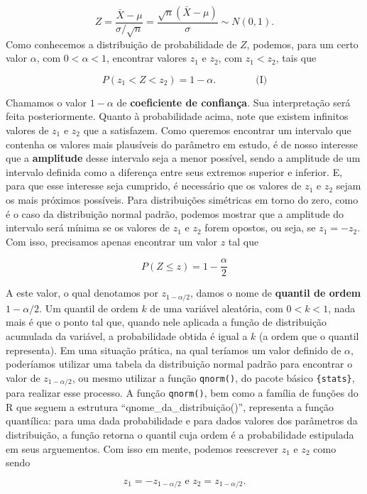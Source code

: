 \documentclass[
  letterpaper,
  DIV=11,
  numbers=noendperiod]{scrreprt}
\begin{document}
\[
Z = \frac{\bar{X} - \mu}{\sigma/\sqrt{n}} = \frac{\sqrt{n}\left(\bar{X} - \mu\right)}{\sigma} \sim N(0, 1).
\] Como conhecemos a distribuição de probabilidade de \(Z\), podemos,
para um certo valor \(\alpha\), com \(0 < \alpha < 1\), encontrar
valores \(z_1\) e \(z_2\), com \(z_1 < z_2\), tais que

\[
P(z_1 < Z < z_2) = 1 - \alpha.  \qquad \qquad \text{(I)}
\]

Chamamos o valor \(1 - \alpha\) de \textbf{coeficiente de confiança}.
Sua interpretação será feita posteriormente. Quanto à probabilidade
acima, note que existem infinitos valores de \(z_1\) e \(z_2\) que a
satisfazem. Como queremos encontrar um intervalo que contenha os valores
mais plausíveis do parâmetro em estudo, é de nosso interesse que a
\textbf{amplitude} desse intervalo seja a menor possível, sendo a
amplitude de um intervalo definida como a diferença entre seus extremos
superior e inferior. E, para que esse interesse seja cumprido, é
necessário que os valores de \(z_1\) e \(z_2\) sejam os mais próximos
possíveis. Para distribuições simétricas em torno do zero, como é o caso
da distribuição normal padrão, podemos mostrar que a amplitude do
intervalo será mínima se os valores de \(z_1\) e \(z_2\) forem opostos,
ou seja, se \(z_1 = -z_2\). Com isso, precisamos apenas encontrar um
valor \(z\) tal que

\[
P(Z \leqslant z) = 1 - \frac{\alpha}{2}
\]

A este valor, o qual denotamos por \(z_{1 - \alpha/2}\), damos o nome de
\textbf{quantil de ordem} \(1 - \alpha/2\). Um quantil de ordem \(k\) de
uma variável aleatória, com \(0 < k < 1\), nada mais é que o ponto tal
que, quando nele aplicada a função de distribuição acumulada da
variável, a probabilidade obtida é igual a \(k\) (a ordem que o quantil
representa). Em uma situação prática, na qual teríamos um valor definido
de \(\alpha\), poderíamos utilizar uma tabela da distribuição normal
padrão para encontrar o valor de \(z_{1 - \alpha/2}\), ou mesmo utilizar
a função \texttt{qnorm()}, do pacote básico \texttt{\{stats\}}, para
realizar esse processo. A função \texttt{qnorm()}, bem como a família de
funções do R que seguem a estrutura ``qnome\_da\_distribuição()'',
representa a função quantílica: para uma dada probabilidade e para dados
valores dos parâmetros da distribuição, a função retorna o quantil cuja
ordem é a probabilidade estipulada em seus arguementos. Com isso em
mente, podemos reescrever \(z_1\) e \(z_2\) como sendo

\[
z_1 = -z_{1 - \alpha/2} \text{ e } z_2 = z_{1 - \alpha/2}.
\]
\end{document}

